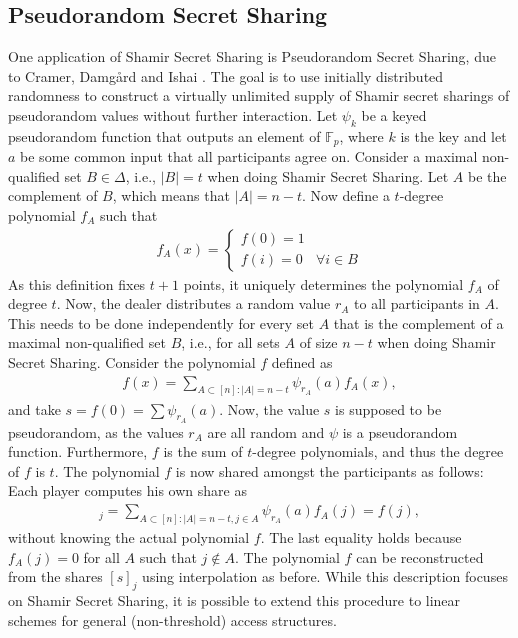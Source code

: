 \documentclass[11pt]{article}
\newcommand{\F}{\mathbb{F}}
\begin{document}
\subsection*{Pseudorandom Secret Sharing}
One application of Shamir Secret Sharing is Pseudorandom Secret Sharing, due to Cramer, Damg{\aa}rd and Ishai \cite{CraDamIsh05}. The goal is to use initially distributed randomness to construct a virtually unlimited supply of Shamir secret sharings of pseudorandom values without further interaction. Let $\psi_k$ be a keyed pseudorandom function that outputs an element of $\F_p$, where $k$ is the key and let $a$ be some common input that all participants agree on. Consider a maximal non-qualified set $B\in\Delta$, i.e., $|B| = t$ when doing Shamir Secret Sharing. Let $A$ be the complement of $B$, which means that $|A| = n-t$. Now define a $t$-degree polynomial $f_A$ such that
  \begin{align*}
  f_A(x) = \left\{\begin{array}{cc}
                  f(0) = 1& \\
                  f(i) = 0 & \forall i \in B
                 \end{array}\right.
  \end{align*}
As this definition fixes $t+1$ points, it uniquely determines the polynomial $f_A$ of degree $t$. Now, the dealer distributes a random value $r_A$ to all participants in $A$. This needs to be done independently for every set $A$ that is the complement of a maximal non-qualified set $B$, i.e., for all sets $A$ of size $n-t$ when doing Shamir Secret Sharing. Consider the polynomial $f$ defined as
  \begin{align*}
  f(x) = \sum_{A \subset [n] : |A| = n-t} \psi_{r_A}(a)f_A(x),
  \end{align*}
and take $s = f(0) = \sum \psi_{r_A}(a)$. Now, the value $s$ is supposed to be pseudorandom, as the values $r_A$ are all random and $\psi$ is a pseudorandom function. Furthermore, $f$ is the sum of $t$-degree polynomials, and thus the degree of $f$ is $t$. The polynomial $f$ is now shared amongst the participants as follows:
Each player computes his own share as 
  \begin{align*}
  [s]_j = \sum_{A \subset [n] : |A| = n-t, j\in A} \psi_{r_A}(a) f_A(j) = f(j),
  \end{align*}
without knowing the actual polynomial $f$. The last equality holds because $f_A(j) = 0$ for all $A$ such that $j\not\in A$. The polynomial $f$ can be reconstructed from the shares $[s]_j$ using interpolation as before. While this description focuses on Shamir Secret Sharing, it is possible to extend this procedure to linear schemes for general (non-threshold) access structures.
\end{document}
